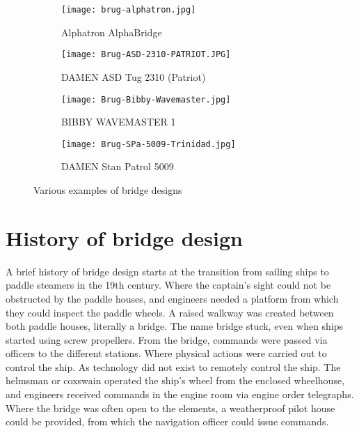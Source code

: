 \begin{figure}[H]
	\centering
	
	\begin{subfigure}[b]{0.45\textwidth}
		\texttt{[image: brug-alphatron.jpg]}
		\caption{Alphatron AlphaBridge}
	\end{subfigure}
	\hfill
	\begin{subfigure}[b]{0.45\textwidth}
		\texttt{[image: Brug-ASD-2310-PATRIOT.JPG]}
		\caption{DAMEN ASD Tug 2310 (Patriot)}
	\end{subfigure}
	\hfill
	\begin{subfigure}[b]{0.45\textwidth}
		\texttt{[image: Brug-Bibby-Wavemaster.jpg]}
		\caption{BIBBY WAVEMASTER 1}
	\end{subfigure}
	\hfill
	\begin{subfigure}[b]{0.45\textwidth}
		\texttt{[image: Brug-SPa-5009-Trinidad.jpg]}
		\caption{DAMEN Stan Patrol 5009}
	\end{subfigure}	
	
	\caption{Various examples of bridge designs}
	\label{fig:bridge-example}
	
\end{figure}

\section{History of bridge design}
A brief history of bridge design starts at the transition from sailing ships to paddle steamers in the 19th century. Where the captain's sight could not be obstructed by the paddle houses, and engineers needed a platform from which they could inspect the paddle wheels. A raised walkway was created between both paddle houses, literally a bridge. The name bridge stuck, even when ships started using screw propellers. From the bridge, commands were passed via officers to the different stations. Where physical actions were carried out to control the ship. As technology did not exist to remotely control the ship. The helmsman or coxswain operated the ship's wheel from the enclosed wheelhouse, and engineers received commands in the engine room via engine order telegraphs. Where the bridge was often open to the elements, a weatherproof pilot house could be provided, from which the navigation officer could issue commands.

